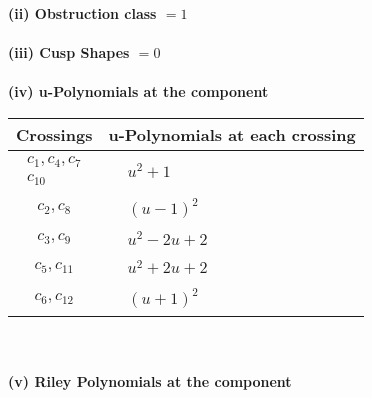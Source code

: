 \documentclass[1p]{elsarticle_modified}
\theoremstyle{definition}
\begin{document}
\flushleft \textbf{(ii) Obstruction class $= 1$}\\~\\
\flushleft \textbf{(iii) Cusp Shapes $= 0$}\\~\\
\newpage\renewcommand{\arraystretch}{1}
\flushleft \textbf{(iv) u-Polynomials at the component}\newline \\
\begin{tabular}{m{50pt}|m{274pt}}
Crossings & \hspace{64pt}u-Polynomials at each crossing \\
\hline $$\begin{aligned}c_{1},c_{4},c_{7}\\c_{10}\end{aligned}$$&$\begin{aligned}
&u^2+1
\end{aligned}$\\
\hline $$\begin{aligned}c_{2},c_{8}\end{aligned}$$&$\begin{aligned}
&(u-1)^2
\end{aligned}$\\
\hline $$\begin{aligned}c_{3},c_{9}\end{aligned}$$&$\begin{aligned}
&u^2-2 u+2
\end{aligned}$\\
\hline $$\begin{aligned}c_{5},c_{11}\end{aligned}$$&$\begin{aligned}
&u^2+2 u+2
\end{aligned}$\\
\hline $$\begin{aligned}c_{6},c_{12}\end{aligned}$$&$\begin{aligned}
&(u+1)^2
\end{aligned}$\\
\hline
\end{tabular}\\~\\
\newpage\renewcommand{\arraystretch}{1}
\flushleft \textbf{(v) Riley Polynomials at the component}\newline \\
\end{document}
